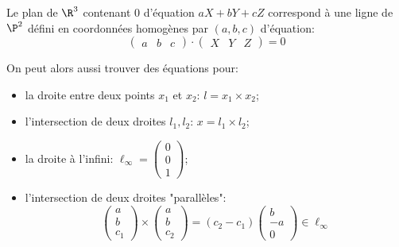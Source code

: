 \documentclass[info, math]{mpb-cours}
\begin{document}
Le plan de $\R^{3}$ contenant $0$ d'équation $aX + bY + cZ$ correspond à une ligne de $\P^{2}$ défini en coordonnées homogènes par $(a, b, c)$ d'équation:
\begin{equation*}
	\begin{pmatrix} a & b & c\end{pmatrix} \cdot \begin{pmatrix} X & Y & Z\end{pmatrix} = 0
\end{equation*}

On peut alors aussi trouver des équations pour:
\begin{itemize}
	\item la droite entre deux points $x_{1}$ et $x_{2}$: $l = x_{1} \times x_{2}$;
	\item l'intersection de deux droites $l_{1}, l_{2}$: $x = l_{1} \times l_{2}$;
	\item la droite à l'infini: $\ell_{\infty} = \begin{pmatrix} 0 \\ 0 \\ 1 \end{pmatrix}$;
	\item l'intersection de deux droites "parallèles":
	      \begin{equation*}
		      \begin{pmatrix}
			      a \\ b \\c_{1}
		      \end{pmatrix} \times
		      \begin{pmatrix}
			      a \\ b \\c_{2}
		      \end{pmatrix} = (c_{2} - c_{1})
		      \begin{pmatrix}
			      b \\ -a \\ 0
		      \end{pmatrix} \in \ell_{\infty}
	      \end{equation*}
\end{itemize}
\end{document}
